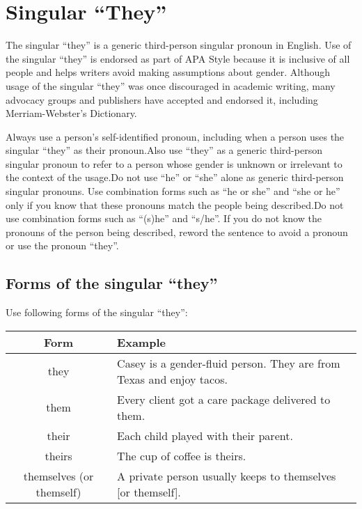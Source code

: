 
\chapter{Singular \enquote{They}}\label{ch:singular-they}

The singular \enquote{they} is a generic third-person singular pronoun in English. Use of the singular \enquote{they} is endorsed as part of APA Style because it is inclusive of all people and helps writers avoid making assumptions about gender. Although usage of the singular \enquote{they} was once discouraged in academic writing, many advocacy groups and publishers have accepted and endorsed it, including Merriam-Webster’s Dictionary.

Always use a person’s self-identified pronoun, including when a person uses the singular \enquote{they} as their pronoun.Also use \enquote{they} as a generic third-person singular pronoun to refer to a person whose gender is unknown or irrelevant to the context of the usage.Do not use \enquote{he} or \enquote{she} alone as generic third-person singular pronouns. Use combination forms such as \enquote{he or she} and \enquote{she or he} only if you know that these pronouns match the people being described.Do not use combination forms such as \enquote{(s)he} and \enquote{s/he}. If you do not know the pronouns of the person being described, reword the sentence to avoid a pronoun or use the pronoun \enquote{they}.

\section{Forms of the singular \enquote{they}}
Use following forms of the singular \enquote{they}:

    \begin{table}[htb]
        \centering
        \begin{tabular}{|c|l|}
            \hline
            \rowcolor[HTML]{DDE7FA}
            Form                     & Example                                                              \\ \hline
            they                     & Casey is a gender-fluid person. They are from Texas and enjoy tacos. \\ \hline
            them                     & Every client got a care package delivered to them.                   \\ \hline
            their                    & Each child played with their parent.                                 \\ \hline
            theirs                   & The cup of coffee is theirs.                                         \\ \hline
            themselves (or themself) & A private person usually keeps to themselves {[}or themself{]}.      \\ \hline
        \end{tabular}
    \end{table}

